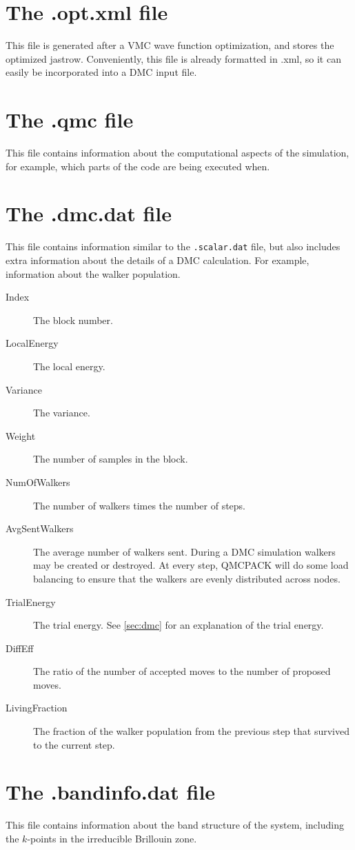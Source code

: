 \section{The .opt.xml file}
\label{sec:optxml_file}
This file is generated after a VMC wave function optimization, and stores the optimized jastrow.
Conveniently, this file is already formatted in .xml, so it can easily be incorporated into a DMC input file.

\section{The .qmc file}
\label{sec:qmc_file}
This file contains information about the computational aspects of the simulation, for example, which parts of the code are being executed when.

\section{The .dmc.dat file}
\label{sec:dmc_file}
This file contains information similar to the \texttt{.scalar.dat} file, but also includes extra information about the details of a DMC calculation. For example, information about the walker population.

\begin{description}
\item[Index] The block number.
\item[LocalEnergy] The local energy.
\item[Variance] The variance.
\item[Weight] The number of samples in the block.
\item[NumOfWalkers] The number of walkers times the number of steps.
\item[AvgSentWalkers] The average number of walkers sent. During a DMC simulation walkers may be created or destroyed. At every step, QMCPACK will do some load balancing to ensure that the walkers are evenly distributed across nodes.
\item[TrialEnergy] The trial energy. See \ref{sec:dmc} for an explanation of the trial energy.
\item[DiffEff] The ratio of the number of accepted moves to the number of proposed moves.
\item[LivingFraction] The fraction of the walker population from the previous step that survived to the current step.
\end{description}


\section{The .bandinfo.dat file}
\label{sec:bandinfo_file}
This file contains information about the band structure of the system, including the $k$-points in the irreducible Brillouin zone.
